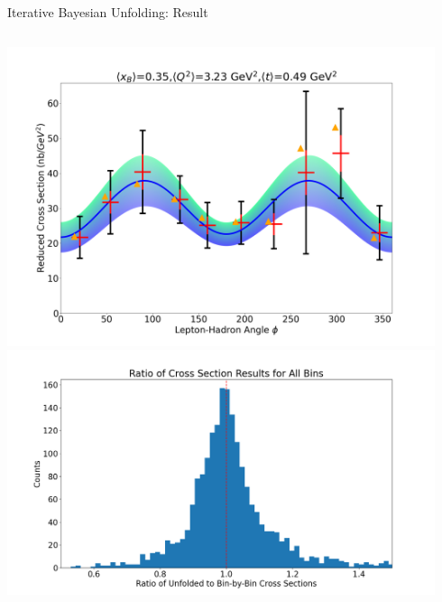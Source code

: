 \documentclass[aspectratio=169]{beamer}
\begin{document}
\begin{frame}{Iterative Bayesian Unfolding: Result}
\begin{columns}
\includegraphics[width=0.94\textwidth]{defense/sample_prelim_xsec.png}
\includegraphics[width=0.94\textwidth]{Main/ibu/results/binbybin_to_unfolded.png}
    
\end{columns}

\end{frame}
\end{document}
